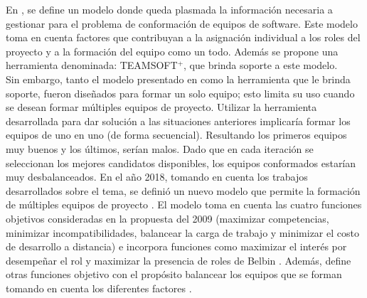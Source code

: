 En \cite{Mayi09}, se define un modelo donde queda plasmada la información necesaria a gestionar para el problema de conformación de equipos de software. Este modelo toma en cuenta factores que contribuyan a la asignación individual a los roles del proyecto y a la formación del equipo como un todo. Además se propone una herramienta denominada: TEAMSOFT$^+$, que brinda soporte a este modelo.\\

Sin embargo, tanto el modelo presentado en \cite{Mayi09} como la herramienta que le brinda soporte, fueron diseñados para formar un solo equipo; esto limita su uso cuando se desean formar múltiples equipos de proyecto. Utilizar la herramienta desarrollada para dar solución a las situaciones anteriores implicaría formar los equipos de uno en uno (de forma secuencial). Resultando los primeros equipos muy buenos y los últimos, serían malos. Dado que en cada iteración se seleccionan los mejores candidatos disponibles, los equipos conformados estarían muy desbalanceados. En el año 2018, tomando en cuenta los trabajos desarrollados sobre el tema, se definió un nuevo modelo que permite la formación de múltiples equipos de proyecto \cite{Duran2019}. El modelo toma en cuenta las cuatro funciones objetivos consideradas en la propuesta del 2009 \cite{Mayi09} (maximizar competencias, minimizar incompatibilidades, balancear la carga de trabajo y minimizar el costo de desarrollo a distancia) e incorpora funciones como maximizar el interés por desempeñar el rol y maximizar la presencia de roles de Belbin \cite{Mayi09}. Además, define otras funciones objetivo con el propósito balancear los equipos que se forman tomando en cuenta los diferentes factores \cite{Duran2019}.\\

